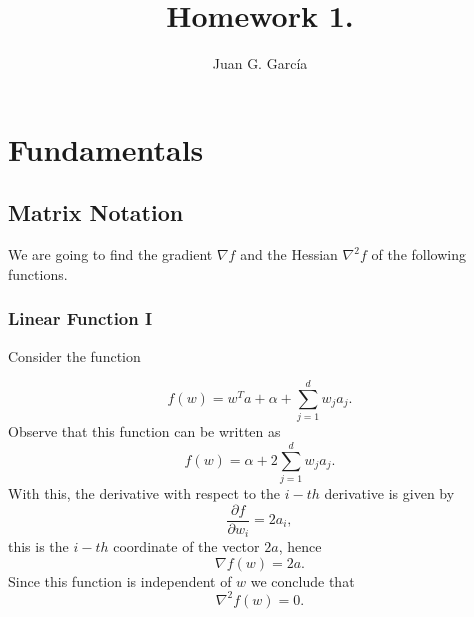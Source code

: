 \documentclass[11pt]{article}
\title{Homework 1.}
\author{Juan G. Garc{\'i}a}
\theoremstyle{plain}
\begin{document}
\maketitle







\section{Fundamentals}

\subsection{Matrix Notation}
We are going to find the gradient $\nabla f$ and the Hessian $\nabla^{2} f$ of the following functions.

\subsubsection{Linear Function I}
Consider the function 

\begin{equation*}
f(w)=w^{T}a+\alpha+\sum_{j=1}^{d}w_{j}a_{j}.
\end{equation*}
Observe that this function can be written as 
\begin{equation*}
f(w)=\alpha+2\sum_{j=1}^{d}w_{j}a_{j}.
\end{equation*}
With this, the derivative with respect to the $i-th$ derivative is given by
\begin{equation*}
\frac{\partial f}{\partial w_{i}}=2a_{i},
\end{equation*}
this is the $i-th$ coordinate of the vector $2a$, hence
\begin{equation*}
\nabla f(w)=2a.
\end{equation*}
Since this function is independent of $w$ we conclude that
\begin{equation*}
\nabla^{2} f(w)=0.
\end{equation*}
\end{document}
